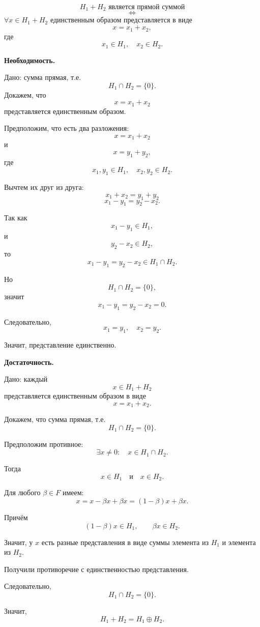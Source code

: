 \begin{theorem}
    \[
        H_1 + H_2 \text{ является прямой суммой}
    \]
    \[
        \Longleftrightarrow
    \]
    $\forall x \in H_1 + H_2$ единственным образом представляется в виде
    \[
        x = x_1 + x_2,
    \]
    где
    \[
        x_1 \in H_1,\quad x_2 \in H_2.
    \]
\end{theorem}

\begin{Proof}
    {\bf Необходимость.}

    Дано: сумма прямая, т.е.
    \[
        H_1 \cap H_2 = \{0\}.
    \]
    Докажем, что
    \[
        x = x_1 + x_2
    \]
    представляется единственным образом.

    Предположим, что есть два разложения:
    \[
        x = x_1 + x_2
    \]
    и
    \[
        x = y_1 + y_2,
    \]
    где
    \[
        x_1,y_1 \in H_1,\quad x_2,y_2 \in H_2.
    \]

    Вычтем их друг из друга:
    \[
        x_1 + x_2 = y_1 + y_2
    \]
    \[
        x_1 - y_1 = y_2 - x_2.
    \]

    Так как
    \[
        x_1 - y_1 \in H_1,
    \]
    и
    \[
        y_2 - x_2 \in H_2,
    \]
    то
    \[
        x_1 - y_1 = y_2 - x_2 \in H_1 \cap H_2.
    \]

    Но
    \[
        H_1 \cap H_2 = \{0\},
    \]
    значит
    \[
        x_1 - y_1 = y_2 - x_2 = 0.
    \]

    Следовательно,
    \[
        x_1 = y_1,\quad x_2 = y_2.
    \]

    Значит, представление единственно.

    \bigskip

    {\bf Достаточность.}

    Дано: каждый
    \[
        x \in H_1 + H_2
    \]
    представляется единственным образом в виде
    \[
        x = x_1 + x_2.
    \]

    Докажем, что сумма прямая, т.е.
    \[
        H_1 \cap H_2 = \{0\}.
    \]

    Предположим противное:
    \[
        \exists x \neq 0:\quad x \in H_1 \cap H_2.
    \]

    Тогда
    \[
        x \in H_1
        \quad \text{и} \quad
        x \in H_2.
    \]

    Для любого $\beta \in F$ имеем:
    \[
        x = x - \beta x + \beta x
        =
        (1-\beta)x + \beta x.
    \]

    Причём
    \[
        (1-\beta)x \in H_1,
        \qquad
        \beta x \in H_2.
    \]

    Значит, у $x$ есть разные представления в виде суммы элемента из $H_1$ и элемента из $H_2$.

    Получили противоречие с единственностью представления.

    Следовательно,
    \[
        H_1 \cap H_2 = \{0\}.
    \]

    Значит,
    \[
        H_1 + H_2 = H_1 \oplus H_2.
    \]
\end{Proof}

